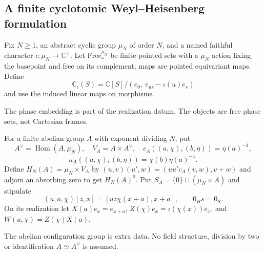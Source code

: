 \subsection{A finite cyclotomic Weyl--Heisenberg formulation}

\begin{definition}
Fix $N\geq1$, an abstract cyclic group $\mu_N$ of order $N$, and a named
faithful character $\iota:\mu_N\to\mathbb C^\times$. Let
$\mathrm{Free}_*^{\mu_N}$ be finite pointed sets with a $\mu_N$ action
fixing the basepoint and free on its complement; maps are pointed
equivariant maps. Define
\[
\mathbb C_\iota(S)=\mathbb C[S]/(e_0,\ e_{us}-\iota(u)e_s)
\]
and use the induced linear maps on morphisms.
\end{definition}
\begin{scope}The phase embedding is part of the realization datum. The
objects are free phase sets, not Cartesian frames.\end{scope}

\begin{definition}
For a finite abelian group $A$ with exponent dividing $N$, put
\[
A^\vee=\operatorname{Hom}(A,\mu_N),\quad V_A=A\times A^\vee,
\quad c_A((a,\chi),(b,\eta))=\eta(a)^{-1},
\]
\[
\kappa_A((a,\chi),(b,\eta))=\chi(b)\eta(a)^{-1}.
\]
Define $H_N(A)=\mu_N\times V_A$ by
$(u,v)(u',w)=(uu'c_A(v,w),v+w)$ and adjoin an absorbing zero to get
$H_N(A)^0$. Put $S_A=\{0\}\sqcup(\mu_N\times A)$ and stipulate
\[
(u,a,\chi)[z,x]=[uz\chi(x+a),x+a],\qquad 0_Hs=0_S.
\]
On its realization let $X(a)e_x=e_{x+a}$,
$Z(\chi)e_x=\iota(\chi(x))e_x$, and $W(a,\chi)=Z(\chi)X(a)$.
\end{definition}
\begin{scope}The abelian configuration group is extra data. No field
structure, division by two or identification $A\simeq A^\vee$ is assumed.\end{scope}


